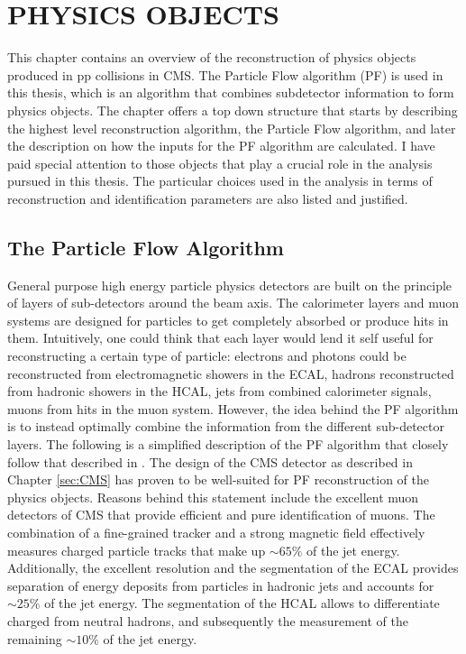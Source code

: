 \chapter{PHYSICS OBJECTS}\label{sec:objects}
\noindent\justify
This chapter contains an overview of the reconstruction of physics objects produced in pp collisions in CMS. 
The Particle Flow algorithm (PF) is used in this thesis, which is an algorithm that combines subdetector information to form physics objects. 
\newpara
\noindent\justify
The chapter offers a top down structure that starts by describing the highest level reconstruction algorithm, the Particle Flow algorithm, and later the description on how the inputs for the PF algorithm are calculated. 
I have paid special attention to those objects that play a crucial role in the analysis pursued in this thesis. 
The particular choices used in the analysis in terms of reconstruction and identification parameters are also listed and justified.
\newpage
\section{The Particle Flow Algorithm}\label{sec:PF}
\noindent\justify
General purpose high energy particle physics detectors are built on the principle of layers of sub-detectors around the beam axis. 
The calorimeter layers and muon systems are designed for particles to get completely absorbed or produce hits in them. 
Intuitively, one could think that each layer would lend it self useful for reconstructing a certain type of particle: electrons and photons could be reconstructed from electromagnetic showers in the ECAL, hadrons reconstructed from hadronic showers in the HCAL, jets from combined calorimeter signals, muons from hits in the muon system. 
However, the idea behind the PF algorithm is to instead optimally combine the information from the different sub-detector layers.   
The following is a simplified description of the PF algorithm that closely follow that described in \cite{Sirunyan:2017ulk}.
\newpara
\noindent\justify
The design of the CMS detector as described in Chapter \ref{sec:CMS} has proven to be well-suited for PF reconstruction of the physics objects. 
Reasons behind this statement include the excellent muon detectors of CMS that provide efficient and pure identification of muons. 
The combination of a fine-grained tracker and a strong magnetic field effectively measures charged particle tracks that make up $\sim65\%$ of the jet energy. 
Additionally, the excellent resolution and the segmentation of the ECAL provides separation of energy deposits from particles in hadronic jets and accounts for $\sim25\%$ of the jet energy. 
The segmentation of the HCAL allows to differentiate charged from neutral hadrons, and subsequently the measurement of the remaining $\sim10\%$ of the jet energy. 
